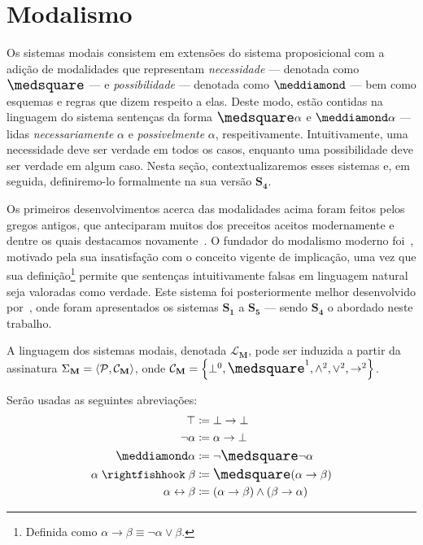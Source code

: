 \section{Modalismo}
    Os sistemas modais consistem em extensões do sistema proposicional com a adição de modalidades que representam \emph{necessidade} --- denotada como $\nec$ --- e \emph{possibilidade} --- denotada como $\pos$ --- bem como esquemas e regras que dizem respeito a elas. Deste modo, estão contidas na linguagem do sistema sentenças da forma $\nec\alpha$ e $\pos\alpha$ --- lidas \emph{necessariamente} $\alpha$ e \emph{possivelmente} $\alpha$, respeitivamente. Intuitivamente, uma necessidade deve ser verdade em todos os casos, enquanto uma possibilidade deve ser verdade em algum caso. Nesta seção, contextualizaremos esses sistemas e, em seguida, definiremo-lo formalmente na sua versão $\mathbf{S_4}$.

    Os primeiros desenvolvimentos acerca das modalidades acima foram feitos pelos gregos antigos, que anteciparam muitos dos preceitos aceitos modernamente e dentre os quais destacamos novamente~\cite{Aristotle}. O fundador do modalismo moderno foi~\cite{Lewis}, motivado pela sua insatisfação com o conceito vigente de implicação, uma vez que sua definição\footnote{Definida como $\alpha\to\beta\equiv\neg\alpha\vee\beta$.} permite que sentenças intuitivamente falsas em linguagem natural seja valoradas como verdade. Este sistema foi posteriormente melhor desenvolvido por~\cite{Langford}, onde foram apresentados os sistemas $\mathbf{S_1}$ a $\mathbf{S_5}$ --- sendo $\mathbf{S_4}$ o abordado neste trabalho.

    \begin{definition}
        A linguagem dos sistemas modais, denotada $\mathcal{L}_\mathbf{M}$, pode ser induzida a partir da assinatura $\Sigma_\mathbf{M}=\langle\mathcal{P},\mathcal{C}_\mathbf{M}\rangle$, onde $\mathcal{C}_\mathbf{M}=\set{\bot^0,\nec^1,\wedge^2,\vee^2,\to^2}$.
    \end{definition}

    \begin{notation}
        Serão usadas as seguintes abreviações:
        \begin{align*}
            \top&\coloneqq\bot\to\bot\\
            \neg\alpha&\coloneqq\alpha\to\bot\\
            \pos\alpha&\coloneqq\neg\nec\neg\alpha\\
            \alpha\strictif\beta&\coloneqq\nec(\alpha\to\beta)\\
            \alpha\leftrightarrow\beta&\coloneqq(\alpha\to\beta)\wedge(\beta\to\alpha)
        \end{align*}
    \end{notation}

